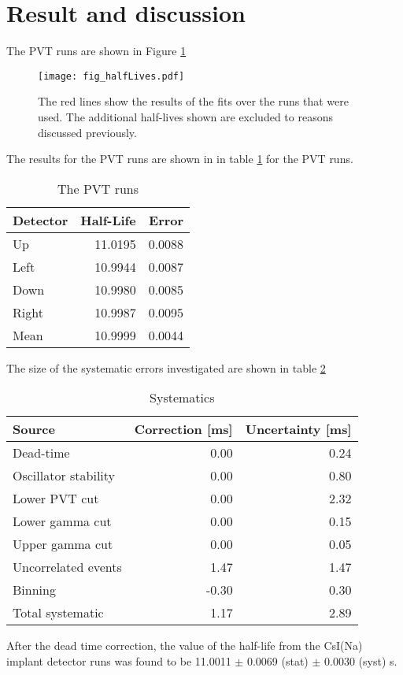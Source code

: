 \documentclass[main.tex]{subfiles}
\begin{document}
\section{Result and discussion}
\label{sec:result}

The PVT runs are shown in Figure \ref{fig:PVT2by2}

\begin{figure}[!htb]
	\centerline{\texttt{[image: fig\_halfLives.pdf]}}
	\caption{The red lines show the results of the fits over the runs that were used.
		 The additional half-lives shown are excluded to reasons discussed previously. 
		}
	\label{fig:PVT2by2}
\end{figure}

The results for the PVT runs are shown in  in table \ref{tab:PVTTable} for the PVT runs.

	\begin{table}[!hbt]
			\centering
			\caption{The PVT runs}
			\begin{tabular}{l|r|r}
			Detector & Half-Life & Error \\ \hline
			Up & 11.0195 & 0.0088 \\
			Left & 10.9944 & 0.0087 \\
			Down & 10.9980 & 0.0085 \\
			Right & 10.9987 & 0.0095 \\ \hline
			Mean & 10.9999 & 0.0044
			\end{tabular}
			\label{tab:PVTTable}
	\end{table}

The size of the systematic errors investigated are shown in table \ref{tab:SysTable} 

\begin{table}[!hbt]
	\caption{Systematics}
	\centering
	\label{tab:err-budget}
		\begin{tabular}{l|r|r}
		Source & Correction [ms] & Uncertainty [ms] \\ \hline
		Dead-time & 0.00 & 0.24 \\
		Oscillator stability & 0.00 & 0.80 \\
		Lower PVT cut & 0.00 & 2.32 \\
		Lower gamma cut & 0.00 &  0.15\\
		Upper gamma cut  & 0.00 & 0.05 \\ 
		Uncorrelated events & 1.47 & 1.47 \\
		Binning & -0.30 & 0.30 \\ \hline
		Total systematic & 1.17 & 2.89
		\end{tabular}
	\label{tab:SysTable}
\end{table}
After the dead time correction, the value of the half-life from the CsI(Na) implant detector runs was found to be 11.0011 $\pm$ 0.0069 (stat) $\pm$ 0.0030 (syst) s.
\end{document}
